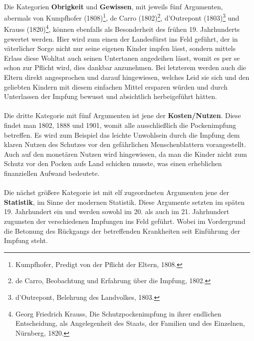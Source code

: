 \documentclass[
    a4paper,
    12pt,
    hyphens,
    chapterprefix=true,
    headheight=33pt,
    footheight=29pt,
    headings=optiontohead, %
]{scrartcl}
\begin{document}
{\\
Die Kategorien \textbf{Obrigkeit} und \textbf{Gewissen}, mit jeweils fünf Argumenten, abermals von Kumpfhofer (1808)\footnote{Kumpfhofer, Predigt von der Pflicht der Eltern, 1808.}, de Carro (1802)\footnote{de Carro, Beobachtung und Erfahrung über die Impfung, 1802.}, d'Outrepont (1803)\footnote{d'Outrepont, Belehrung des Landvolkes, 1803.} und Krauss (1820)\footnote{Georg Friedrich Krauss, Die Schutzpockenimpfung in ihrer endlichen Entscheidung, als Angelegenheit des Staats, der Familien und des Einzelnen, Nürnberg, 1820.}, können ebenfalls als Besonderheit des frühen 19. Jahrhunderts gewertet werden. Hier wird zum einen der Landesfürst ins Feld geführt, der in väterlicher Sorge nicht nur seine eigenen Kinder impfen lässt, sondern mittels Erlass diese Wohltat auch seinen Untertanen angedeihen lässt, womit es per se schon zur Pflicht wird, dies dankbar anzunehmen. Bei letzterem werden auch die Eltern direkt angesprochen und darauf hingewiesen, welches Leid sie sich und den geliebten Kindern mit diesem einfachen Mittel ersparen würden und durch Unterlassen der Impfung bewusst und absichtlich herbeigeführt hätten.\\
\\
Die dritte Kategorie mit fünf Argumenten ist jene der \textbf{Kosten/Nutzen}. Diese findet man 1802, 1888 und 1901, womit alle ausschließlich die Pockenimpfung betreffen. Es wird zum Beispiel das leichte Unwohlsein durch die Impfung dem klaren Nutzen des Schutzes vor den gefährlichen Menschenblattern vorangestellt. Auch auf den monetären Nutzen wird hingewiesen, da man die Kinder nicht zum Schutz vor den Pocken aufs Land schicken musste, was einen erheblichen finanziellen Aufwand bedeutete.\\
\\
Die nächst größere Kategorie ist mit elf zugeordneten Argumenten jene der \textbf{Statistik}, im Sinne der modernen Statistik. Diese Argumente setzten im späten 19. Jahrhundert ein und werden sowohl im 20. als auch im 21. Jahrhundert zugunsten der verschiedenen Impfungen ins Feld geführt. Wobei im Vordergrund die Betonung des Rückgangs der betreffenden Krankheiten seit Einführung der Impfung steht.\\

}
\end{document}
